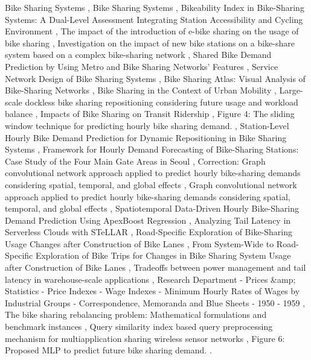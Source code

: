 \documentclass{article}
\begin{document}
Bike Sharing Systems \cite{wang2013analyzing}, Bike Sharing Systems \cite{brinkmann2020bike}, Bikeability Index in Bike-Sharing Systems: A Dual-Level Assessment Integrating Station Accessibility and Cycling Environment \cite{zhang2026bikeability}, The impact of the introduction of e-bike sharing on the usage of bike sharing \cite{li2023impact}, Investigation on the impact of new bike stations on a bike-share system based on a complex bike-sharing network \cite{kim2023investigation}, Shared Bike Demand Prediction by Using Metro and Bike Sharing Networks’ Features \cite{sadeghraimoghaddam2024shared}, Service Network Design of Bike Sharing Systems \cite{vogel2016service}, Bike Sharing Atlas: Visual Analysis of Bike-Sharing Networks \cite{oppermann2018bike}, Bike Sharing in the Context of Urban Mobility \cite{vogel2016bike}, Large-scale dockless bike sharing repositioning considering future usage and workload balance \cite{hua2022largescale}, Impacts of Bike Sharing on Transit Ridership \cite{aljerindimpacts}, Figure 4: The sliding window technique for predicting hourly bike sharing demand. \cite{paperndfigure}, Station-Level Hourly Bike Demand Prediction for Dynamic Repositioning in Bike Sharing Systems \cite{wu2019stationlevel}, Framework for Hourly Demand Forecasting of Bike-Sharing Stations: Case Study of the Four Main Gate Areas in Seoul \cite{hong2022framework}, Correction: Graph convolutional network approach applied to predict hourly bike-sharing demands considering spatial, temporal, and global effects \cite{kim2022correction}, Graph convolutional network approach applied to predict hourly bike-sharing demands considering spatial, temporal, and global effects \cite{kim2019graph}, Spatiotemporal Data-Driven Hourly Bike-Sharing Demand Prediction Using ApexBoost Regression \cite{biswas2025spatiotemporal}, Analyzing Tail Latency in Serverless Clouds with STeLLAR \cite{ustiugov2021analyzing}, Road-Specific Exploration of Bike-Sharing Usage Changes after Construction of Bike Lanes \cite{li2022roadspecific}, From System-Wide to Road-Specific Exploration of Bike Trips for Changes in Bike Sharing System Usage after Construction of Bike Lanes \cite{li2022systemwide}, Tradeoffs between power management and tail latency in warehouse-scale applications \cite{kanev2014tradeoffs}, Research Department - Prices \&amp; Statistics - Price Indexes - Wage Indexes - Minimum Hourly Rates of Wages by Industrial Groups - Correspondence, Memoranda and Blue Sheets - 1950 - 1959 \cite{paper2022research}, The bike sharing rebalancing problem: Mathematical formulations and benchmark instances \cite{dellamico2014bike}, Query similarity index based query preprocessing mechanism for multiapplication sharing wireless sensor networks \cite{verma2020query}, Figure 6: Proposed MLP to predict future bike sharing demand. \cite{paperndfigure}.
\end{document}
